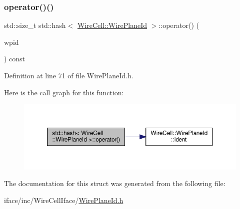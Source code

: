 \subsubsection{\texorpdfstring{operator()()}{operator()()}}
{\footnotesize\ttfamily std\+::size\+\_\+t std\+::hash$<$ \hyperlink{class_wire_cell_1_1_wire_plane_id}{Wire\+Cell\+::\+Wire\+Plane\+Id} $>$\+::operator() (\begin{DoxyParamCaption}\item[{const \hyperlink{class_wire_cell_1_1_wire_plane_id}{Wire\+Cell\+::\+Wire\+Plane\+Id} \&}]{wpid }\end{DoxyParamCaption}) const\hspace{0.3cm}{\ttfamily [inline]}}



Definition at line 71 of file Wire\+Plane\+Id.\+h.

Here is the call graph for this function\+:
\nopagebreak
\begin{figure}[H]
\begin{center}
\leavevmode
\includegraphics[width=350pt]{structstd_1_1hash_3_01_wire_cell_1_1_wire_plane_id_01_4_a83abe96fe67dd07c9fec1be67a95e50a_cgraph}
\end{center}
\end{figure}


The documentation for this struct was generated from the following file\+:\begin{DoxyCompactItemize}
\item 
iface/inc/\+Wire\+Cell\+Iface/\hyperlink{_wire_plane_id_8h}{Wire\+Plane\+Id.\+h}\end{DoxyCompactItemize}
